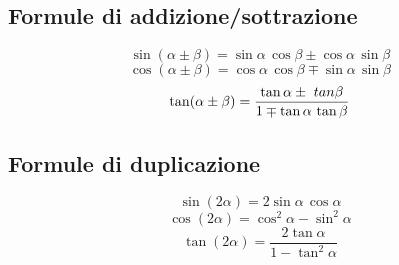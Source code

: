\documentclass{article}
\begin{document}
  \renewcommand{\arraystretch}{1}

  \subsection*{Formule di addizione/sottrazione}
  \begin{equation}
    \sin(\alpha\pm\beta) = \sin\alpha \, \cos\beta \pm \cos\alpha \, \sin\beta
  \end{equation}
  \begin{equation}
    \cos(\alpha\pm\beta) = \cos\alpha \, \cos\beta \mp \sin\alpha \, \sin\beta
  \end{equation}
  \begin{equation}
    \tan(\alpha\pm\beta) = \frac{\tan\alpha \pm \\tan\beta}{1 \mp \tan\alpha \, \tan\beta}
  \end{equation}

  \subsection*{Formule di duplicazione}
  \begin{equation}
    \sin(2\alpha) = 2 \sin\alpha \, \cos\alpha
  \end{equation}
  \begin{equation}
    \cos(2\alpha) = \cos^2 \alpha - \sin^2 \alpha
  \end{equation}
  \begin{equation}
    \tan(2\alpha) = \frac{2\tan\alpha}{1-\tan^2\alpha}
  \end{equation}
\end{document}
